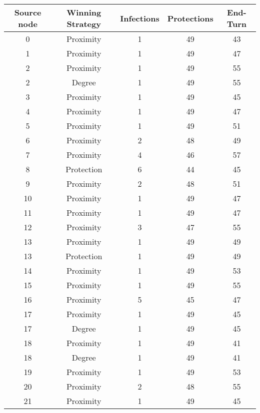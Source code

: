 \documentclass[results.tex]{subfiles}
\begin{document}
\begin{center}
  \begin{tabular}{| c || c | c | c | c |}
    \hline
    {\bfseries Source node} & {\bfseries Winning Strategy} & {\bfseries Infections} & {\bfseries Protections} & {\bfseries End-Turn} \\  %
    \hline\hline
    0 & Proximity & 1 & 49 & 43 \\ 
    \hline
    1 & Proximity & 1 & 49 & 47 \\ 
    \hline
    2 & Proximity & 1 & 49 & 55 \\ 
    \hline
    2 & Degree & 1 & 49 & 55 \\ 
    \hline
    3 & Proximity & 1 & 49 & 45 \\ 
    \hline
    4 & Proximity & 1 & 49 & 47 \\ 
    \hline
    5 & Proximity & 1 & 49 & 51 \\ 
    \hline
    6 & Proximity & 2 & 48 & 49 \\ 
    \hline
    7 & Proximity & 4 & 46 & 57 \\ 
    \hline
    8 & Protection & 6 & 44 & 45 \\ 
    \hline
    9 & Proximity & 2 & 48 & 51 \\ 
    \hline
    10 & Proximity & 1 & 49 & 47 \\ 
    \hline
    11 & Proximity & 1 & 49 & 47 \\ 
    \hline
    12 & Proximity & 3 & 47 & 55 \\ 
    \hline
    13 & Proximity & 1 & 49 & 49 \\ 
    \hline
    13 & Protection & 1 & 49 & 49 \\ 
    \hline
    14 & Proximity & 1 & 49 & 53 \\ 
    \hline
    15 & Proximity & 1 & 49 & 55 \\ 
    \hline
    16 & Proximity & 5 & 45 & 47 \\ 
    \hline
    17 & Proximity & 1 & 49 & 45 \\ 
    \hline
    17 & Degree & 1 & 49 & 45 \\ 
    \hline
    18 & Proximity & 1 & 49 & 41 \\ 
    \hline
    18 & Degree & 1 & 49 & 41 \\ 
    \hline
    19 & Proximity & 1 & 49 & 53 \\ 
    \hline
    20 & Proximity & 2 & 48 & 55 \\ 
    \hline
    21 & Proximity & 1 & 49 & 45 \\ 

\end{tabular}
\end{center}
\end{document}
